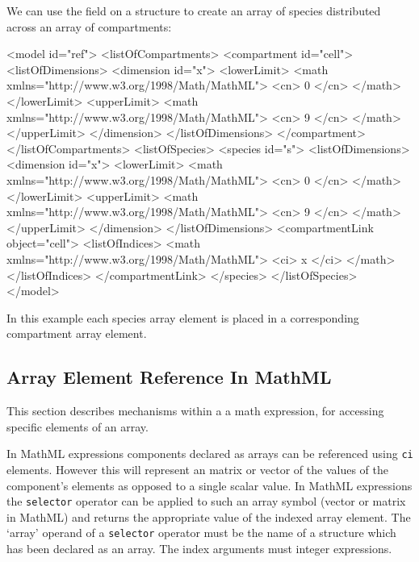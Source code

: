 \documentclass{cekarticle}
\begin{document}
We can use the  field on a  structure to create an array of species
distributed across an array of compartments:
\begin{example}
<model id="ref">
    <listOfCompartments>
        <compartment id="cell">
            <listOfDimensions>
                <dimension id="x">
                    <lowerLimit>
                        <math xmlns="http://www.w3.org/1998/Math/MathML">
                            <cn> 0 </cn>
                        </math>
                    </lowerLimit>
                    <upperLimit>
                        <math xmlns="http://www.w3.org/1998/Math/MathML">
                            <cn> 9 </cn>
                        </math>
                    </upperLimit>
                </dimension>
            </listOfDimensions>
        </compartment>
    </listOfCompartments>
    <listOfSpecies>
        <species id="s">
            <listOfDimensions>
                <dimension id="x">
                    <lowerLimit>
                        <math xmlns="http://www.w3.org/1998/Math/MathML">
                            <cn> 0 </cn>
                        </math>
                    </lowerLimit>
                    <upperLimit>
                        <math xmlns="http://www.w3.org/1998/Math/MathML">
                            <cn> 9 </cn>
                        </math>
                    </upperLimit>
                </dimension>
            </listOfDimensions>
            <compartmentLink object="cell">
                <listOfIndices>
                    <math xmlns="http://www.w3.org/1998/Math/MathML">
                        <ci> x </ci>
                    </math>
                </listOfIndices>
            </compartmentLink>
        </species>
    </listOfSpecies>
</model>
\end{example}
In this example each species array element is placed in a
corresponding compartment array element.

\subsection{Array Element Reference In MathML}
This section describes mechanisms within a a math expression, for accessing specific elements of an
array.

In MathML expressions components declared as arrays can be referenced using \texttt{ci} elements.
However this will represent an matrix or vector of the values of the component's elements as opposed
to a single scalar value.
In MathML expressions the \texttt{selector} operator
can be applied to such an array symbol (vector or matrix in MathML) and
returns the appropriate value of the indexed array element.
The `array' operand of a \texttt{selector} operator must be the name of a
structure which has been declared as an array.  The index arguments must integer expressions.
\end{document}
